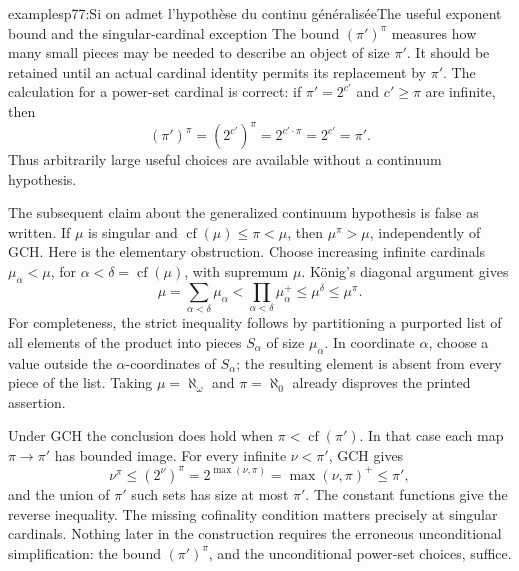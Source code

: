 \begin{dcomment}{examples}{p77:Si on admet l'hypothèse du continu généralisée}{The useful exponent bound and the singular-cardinal exception}
The bound $(\pi')^\pi$ measures how many small pieces may be needed to describe an object of size $\pi'$. It should be retained until an actual cardinal identity permits its replacement by $\pi'$. The calculation for a power-set cardinal is correct: if $\pi'=2^{c'}$ and $c'\geq\pi$ are infinite, then
\[
 (\pi')^\pi=(2^{c'})^\pi=2^{c'\cdot\pi}=2^{c'}=\pi'.
\]
Thus arbitrarily large useful choices are available without a continuum hypothesis.

The subsequent claim about the generalized continuum hypothesis is false as written. If $\mu$ is singular and $\operatorname{cf}(\mu)\leq\pi<\mu$, then $\mu^\pi>\mu$, independently of GCH. Here is the elementary obstruction. Choose increasing infinite cardinals $\mu_\alpha<\mu$, for $\alpha<\delta=\operatorname{cf}(\mu)$, with supremum $\mu$. K\"onig's diagonal argument gives
\[
 \mu=\sum_{\alpha<\delta}\mu_\alpha
       <\prod_{\alpha<\delta}\mu_\alpha^+
       \leq\mu^\delta\leq\mu^\pi.
\]
For completeness, the strict inequality follows by partitioning a purported list of all elements of the product into pieces $S_\alpha$ of size $\mu_\alpha$. In coordinate $\alpha$, choose a value outside the $\alpha$-coordinates of $S_\alpha$; the resulting element is absent from every piece of the list. Taking $\mu=\aleph_\omega$ and $\pi=\aleph_0$ already disproves the printed assertion.

Under GCH the conclusion does hold when $\pi<\operatorname{cf}(\pi')$. In that case each map $\pi\to\pi'$ has bounded image. For every infinite $\nu<\pi'$, GCH gives
\[
 \nu^\pi\leq(2^\nu)^\pi=2^{\max(\nu,\pi)}
 =\max(\nu,\pi)^+\leq\pi',
\]
and the union of $\pi'$ such sets has size at most $\pi'$. The constant functions give the reverse inequality. The missing cofinality condition matters precisely at singular cardinals. Nothing later in the construction requires the erroneous unconditional simplification: the bound $(\pi')^\pi$, and the unconditional power-set choices, suffice.
\end{dcomment}





